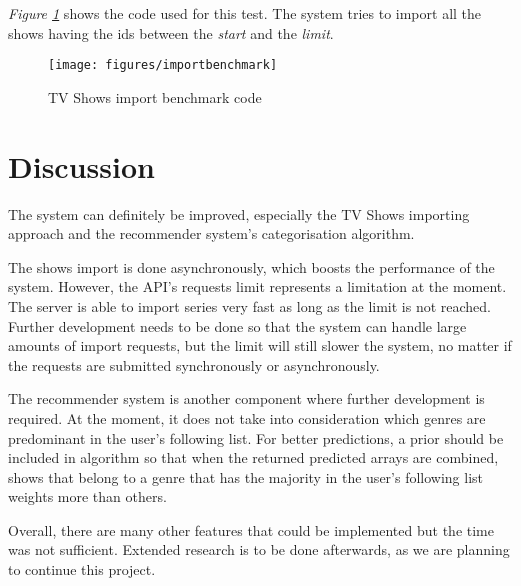 \textit{Figure \ref{fig:importbenchmark}} shows the code used for this test. The system tries to import all the shows having the ids between the \textit{start} and the \textit{limit}.

\begin{figure}[h]
\centering
\texttt{[image: figures/importbenchmark]}
\caption{TV Shows import benchmark code}
\label{fig:importbenchmark}
\end{figure}

\section{Discussion}

The system can definitely be improved, especially the TV Shows importing approach and the recommender system's categorisation algorithm.

The shows import is done asynchronously, which boosts the performance of the system. However, the API's requests limit represents a limitation at the moment. The server is able to import series very fast as long as the limit is not reached. Further development needs to be done so that the system can handle large amounts of import requests, but the limit will still slower the system, no matter if the requests are submitted synchronously or asynchronously.

The recommender system is another component where further development is required. At the moment, it does not take into consideration which genres are predominant in the user's following list. For better predictions, a prior should be included in algorithm so that when the returned predicted arrays are combined, shows that belong to a genre that has the majority in the user's following list weights more than others.

Overall, there are many other features that could be implemented but the time was not sufficient. Extended research is to be done afterwards, as we are planning to continue this project.